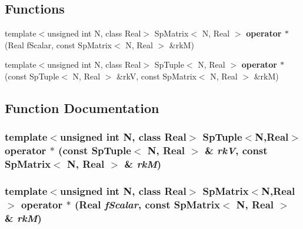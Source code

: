 \subsection*{Functions}
\begin{CompactItemize}
\item 
template$<$unsigned int N, class Real$>$ Sp\-Matrix$<$ N, Real $>$ {\bf operator $\ast$} (Real f\-Scalar, const Sp\-Matrix$<$ N, Real $>$ \&rk\-M)
\item 
template$<$unsigned int N, class Real$>$ Sp\-Tuple$<$ N, Real $>$ {\bf operator $\ast$} (const Sp\-Tuple$<$ N, Real $>$ \&rk\-V, const Sp\-Matrix$<$ N, Real $>$ \&rk\-M)
\end{CompactItemize}


\subsection{Function Documentation}
\subsubsection{\setlength{\rightskip}{0pt plus 5cm}template$<$unsigned int N, class Real$>$ Sp\-Tuple$<$N,Real$>$ operator $\ast$ (const Sp\-Tuple$<$ N, Real $>$ \& {\em rk\-V}, const Sp\-Matrix$<$ N, Real $>$ \& {\em rk\-M})}\label{namespaceSpark_a70}


\subsubsection{\setlength{\rightskip}{0pt plus 5cm}template$<$unsigned int N, class Real$>$ Sp\-Matrix$<$N,Real$>$ operator $\ast$ (Real {\em f\-Scalar}, const Sp\-Matrix$<$ N, Real $>$ \& {\em rk\-M})}\label{namespaceSpark_a69}


